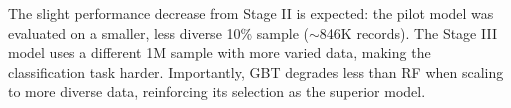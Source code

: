 The slight performance decrease from Stage II is expected: the pilot model was evaluated on a smaller, less diverse 10\% sample ($\sim$846K records). The Stage III model uses a different 1M sample with more varied data, making the classification task harder. Importantly, GBT degrades less than RF when scaling to more diverse data, reinforcing its selection as the superior model.
